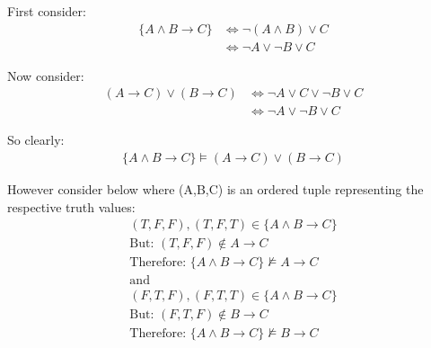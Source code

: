 First consider:
\begin{align*}
    \{A \wedge B \rightarrow C\} &\Leftrightarrow \neg(A \wedge B) \vee C\\
    &\Leftrightarrow \neg A \vee \neg B \vee C
\end{align*}

Now consider:
\begin{align*}
    (A \rightarrow C) \vee (B \rightarrow C) &\Leftrightarrow \neg A \vee C \vee \neg B \vee C\\
    &\Leftrightarrow \neg A \vee \neg B \vee C
\end{align*}

So clearly:
\begin{align*}
    \{A \wedge B \rightarrow C\} \models (A \rightarrow C) \vee (B \rightarrow C)
\end{align*}

However consider below where (A,B,C) is an ordered tuple representing the respective truth values:
\begin{align*}
    (T,F,F), (T,F,T) \in \{A \wedge B \rightarrow C\}\\
    \text{But: } (T,F,F) \notin A \rightarrow C\\
    \text{Therefore: } \{A \wedge B \rightarrow C\} \nvDash A \rightarrow C\\
    \text{and}\\
    (F,T,F), (F,T,T) \in \{A \wedge B \rightarrow C\}\\
    \text{But: } (F,T,F) \notin B \rightarrow C\\
    \text{Therefore: } \{A \wedge B \rightarrow C\} \nvDash B \rightarrow C
\end{align*}